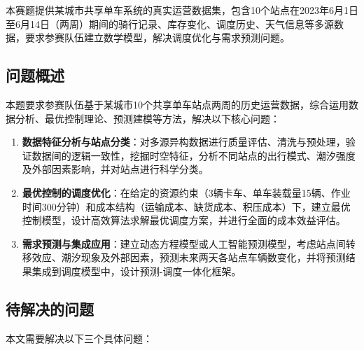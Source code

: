 \documentclass[12pt,a4paper]{ctexart}
\begin{document}
本赛题提供某城市共享单车系统的真实运营数据集，包含10个站点在2023年6月1日至6月14日（两周）期间的骑行记录、库存变化、调度历史、天气信息等多源数据，要求参赛队伍建立数学模型，解决调度优化与需求预测问题。

\subsection{问题概述}

本题要求参赛队伍基于某城市10个共享单车站点两周的历史运营数据，综合运用数据分析、最优控制理论、预测建模等方法，解决以下核心问题：

\begin{enumerate}
    \item \textbf{数据特征分析与站点分类}：对多源异构数据进行质量评估、清洗与预处理，验证数据间的逻辑一致性，挖掘时空特征，分析不同站点的出行模式、潮汐强度及外部因素影响，并对站点进行科学分类。

    \item \textbf{最优控制的调度优化}：在给定的资源约束（3辆卡车、单车装载量15辆、作业时间300分钟）和成本结构（运输成本、缺货成本、积压成本）下，建立最优控制模型，设计高效算法求解最优调度方案，并进行全面的成本效益评估。

    \item \textbf{需求预测与集成应用}：建立动态方程模型或人工智能预测模型，考虑站点间转移效应、潮汐现象及外部因素，预测未来两天各站点车辆数变化，并将预测结果集成到调度模型中，设计预测-调度一体化框架。
\end{enumerate}

\subsection{待解决的问题}

本文需要解决以下三个具体问题：
\end{document}
